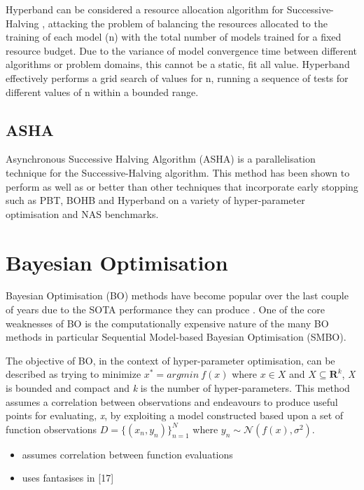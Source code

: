\documentclass{article}
\begin{document}
Hyperband can be considered a resource allocation algorithm for Successive-Halving \cite{45}, attacking the problem of balancing the resources allocated to the training of each model (n) with the total number of models trained for a fixed resource budget. Due to the variance of model convergence time between different algorithms or problem domains, this cannot be a static, fit all value. Hyperband effectively performs a grid search of values for n, running a sequence of tests for different values of n within a bounded range.


\subsection{ASHA}

Asynchronous Successive Halving Algorithm (ASHA) \cite{34} is a parallelisation technique for the Successive-Halving algorithm. This method has been shown to perform as well as or better than other techniques that incorporate early stopping such as PBT, BOHB and Hyperband on a variety of hyper-parameter optimisation and NAS benchmarks.

\section {Bayesian Optimisation}

Bayesian Optimisation (BO) methods have become popular over the last couple of years due to the SOTA performance they can produce \cite{32} \cite{20}. One of the core weaknesses of BO is the computationally expensive nature of the many BO methods in particular Sequential Model-based Bayesian Optimisation (SMBO). 

\par

The objective of BO, in the context of hyper-parameter optimisation, can be described as trying to minimize \(x^* = argmin~ f(x)\) where \(x \in X\) and \(X \subseteq \mathbf{R} ^k\), \textit{X} is bounded and compact and \textit{k} is the number of hyper-parameters. This method assumes a correlation between observations and endeavours to produce useful points for evaluating, \textit{x}, by exploiting a model constructed based upon a set of function observations \( D = \{(x_n,y_n)\}_{n=1}^N\) where \(y_n \sim \mathcal{N}(f(x), \sigma^2) \).


\begin{itemize}

\item assumes correlation between function evaluations

\item uses fantasises in [17]

\end{itemize}
\end{document}
